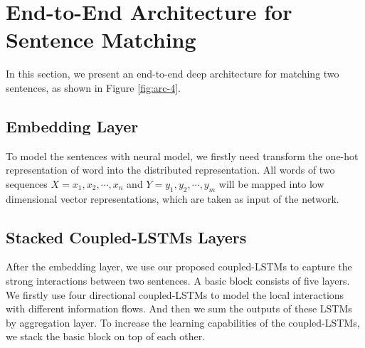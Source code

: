\documentclass{article}
\def\bx{\mathbf{x}}
\def\by{\mathbf{y}}
\def\R{\mathbb{R}}
\begin{document}




\section{End-to-End Architecture for Sentence Matching}
In this section, we present an end-to-end deep architecture for matching two sentences, as shown in Figure \ref{fig:arc-4}.

\subsection{Embedding Layer}
To model the sentences with neural model, we firstly need transform the one-hot representation of word into the distributed representation.
All words of two sequences $X = x_1,x_2,\cdots,x_n$ and $Y = y_1,y_2,\cdots,y_m$ will be mapped into low dimensional vector representations, which are taken as input of the network.
%

\subsection{Stacked Coupled-LSTMs Layers}
After the embedding layer, we use our proposed coupled-LSTMs to capture the strong interactions between two sentences. A basic block consists of five layers. We firstly use four directional coupled-LSTMs to model the local interactions with different information flows. And then we sum the outputs of these LSTMs by aggregation layer.
To increase the learning capabilities of the coupled-LSTMs, we stack the basic block on top of each other.
\end{document}
